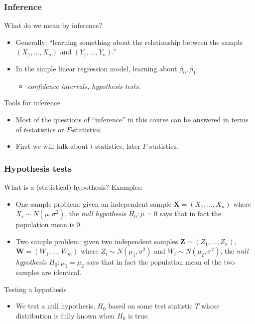 \documentclass[handout]{beamer}
\begin{document}
   \begin{frame} \frametitle{Inference}

   \begin{block}
   {What do we mean by inference?}
   \begin{itemize}[<+->]
   \item Generally: ``learning something about
   the relationship between the sample $(X_1, \dots, X_n)$ and $(Y_1, \dots, Y_n)$.''

   \item In the simple linear regression model, learning about $\beta_0, \beta_1$:
   \begin{itemize}
   \item {\em confidence intervals, hypothesis tests}.
   \end{itemize}
   \end{itemize}
   \end{block}
   \begin{block}
   {Tools for inference}
   \begin{itemize}[<+->]
   \item Most of the questions of ``inference'' in this course
   can be answered in terms of $t$-statistics or $F$-statistics.

   \item First we will talk about $t$-statistics, later $F$-statistics.
   \end{itemize}
   \end{block}
   \end{frame}


   \begin{frame} \frametitle{Hypothesis tests}

   \begin{block}
   {What is a (statistical) hypothesis?}
   Examples:
   \begin{itemize}[<+->]
   \item One sample problem: given an independent sample $\pmb{X}=(X_1, \dots, X_n)$ where $X_i\sim N(\mu,\sigma^2)$, the {\em null hypothesis $H_0:\mu=0$} says that in fact the population mean is 0.

   \item Two sample problem: given two independent samples $\pmb{Z}=(Z_1, \dots, Z_n)$, $\pmb{W}=(W_1, \dots, W_m)$  where $Z_i\sim N(\mu_1,\sigma^2)$ and $W_i \sim N(\mu_2, \sigma^2)$, the {\em null hypothesis $H_0:\mu_1=\mu_2$} says that in fact the population mean of the two samples are identical.
   \end{itemize}
   \end{block}
   \begin{block}
   {Testing a hypothesis}
   \begin{itemize}
   \item We test a null hypothesis, $H_0$ based on some test statistic $T$ whose distribution is fully known when $H_0$ is true.
   \end{itemize}
   \end{block}
   \end{frame}
\end{document}
